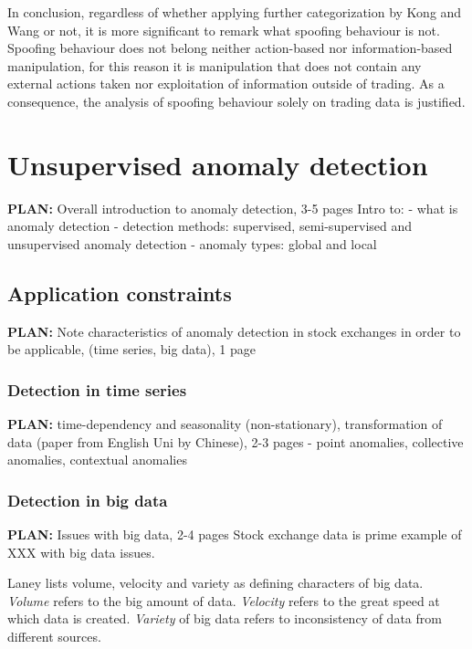\documentclass{tut-thesis}
\begin{document}
In conclusion, regardless of whether applying further categorization by Kong and Wang or not, it is more significant to remark what spoofing behaviour is not. Spoofing behaviour does not belong neither action-based nor information-based manipulation, for this reason it is manipulation that does not contain any external actions taken nor exploitation of information outside of trading. As a consequence, the analysis of spoofing behaviour solely on trading data is justified.



\chapter{Unsupervised anomaly detection}
\textbf{PLAN:} Overall introduction to anomaly detection, 3-5 pages
Intro to:
- what is anomaly detection
- detection methods: supervised, semi-supervised and unsupervised anomaly detection
- anomaly types: global and local

\section{Application constraints}
\textbf{PLAN:} Note characteristics of anomaly detection in stock exchanges in order to be applicable, (time series, big data), 1 page

\subsection{Detection in time series}
\textbf{PLAN:} time-dependency and seasonality (non-stationary), transformation of data (paper from English Uni by Chinese), 2-3 pages
- point anomalies, collective anomalies, contextual anomalies

\subsection{Detection in big data}
\textbf{PLAN:} Issues with big data, 2-4 pages
Stock exchange data is prime example of XXX with big data issues.

Laney \autocite*{Laney2001} lists volume, velocity and variety as defining characters of big data. 
\textit{Volume} refers to the big amount of data.
\textit{Velocity} refers to the great speed at which data is created.
\textit{Variety} of big data refers to inconsistency of data from different sources. 
\end{document}
